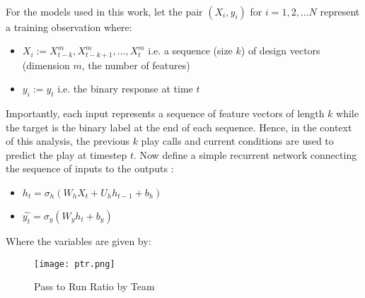\documentclass[11pt]{article}
\begin{document}
\begin{multicols*}{2}
                \paragraph{}
                    For the models used in this work, let the pair $(X_i, y_i)$ for $i = 1,2,...N$ represent a training observation where:
                    
                    \begin{itemize}
                        \item $X_i := X_{t-k}^m, X_{t-k+1}^m, ... , X_{t}^m$ i.e. a sequence (size $k$) of design vectors (dimension $m$, the number of features)  
                        \item $y_i := y_{t}$ i.e. the binary response at time $t$ 
                    \end{itemize}

                    Importantly, each input represents a sequence of feature vectors of length $k$ while the target is the binary label at the end of each sequence. 
                    Hence, in the context of this analysis, the previous $k$ play calls and current conditions are used to predict the play at timestep $t$. 
                    Now define a simple recurrent network connecting the sequence of inputs to the outputs \cite{Dupond19}:

                    \begin{itemize}
                        \item $h_t = \sigma_{h}(W_{h}X_{t} + U_{h}h_{t-1} + b_{h})$ 
                        \item $\hat{y_t} = \sigma_{y}(W_{y}h_{t} + b_{y})$ 
                    \end{itemize}

                    Where the variables are given by:



            \end{multicols*}
            \begin{figure}[ht]
                \texttt{[image: ptr.png]}
                \caption{Pass to Run Ratio by Team}
                \label{fig:Pass to Run Ratio by Team}
            \end{figure}
\end{document}

